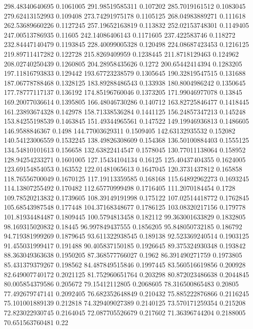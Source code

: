 298.48340640695 0.1061005
291.98519585311 0.107202
285.7019161512 0.1083045
279.62413152993 0.109408
273.74291975178 0.1105125
268.04983889271 0.111618
262.53689660226 0.1127245
257.19652163819 0.113832
252.02153748301 0.1149405
247.00513786935 0.11605
242.14086406143 0.1171605
237.422583746 0.118272
232.84447140479 0.1193845
228.40099005328 0.120498
224.08687423453 0.1216125
219.89711417282 0.122728
215.8269409959 0.1238445
211.8718129463 0.124962
208.02740250439 0.1260805
204.28958435626 0.1272
200.65442414394 0.1283205
197.11816793833 0.129442
193.67723238579 0.1305645
190.32819547515 0.131688
187.06778788468 0.1328125
183.89288486543 0.133938
180.8004986242 0.1350645
177.78777117137 0.136192
174.85196760046 0.1373205
171.99046977078 0.13845
169.20077036614 0.1395805
166.48046730286 0.140712
163.82725846477 0.1418445
161.23893674328 0.142978
158.71338536284 0.1441125
156.24857347213 0.145248
153.84255198539 0.1463845
151.49344965561 0.147522
149.19946936813 0.1486605
146.9588846367 0.1498
144.77003629311 0.1509405
142.63132935532 0.152082
140.54123006559 0.1532245
138.49826308609 0.154368
136.50100884403 0.1555125
134.54810101613 0.156658
132.63822414547 0.1578045
130.77011138064 0.158952
128.94254233271 0.1601005
127.15434104134 0.16125
125.40437404355 0.1624005
123.69154854053 0.163552
122.01481065613 0.1647045
120.3731437812 0.165858
118.76556700049 0.1670125
117.19113359585 0.168168
115.64892962273 0.1693245
114.13807255492 0.170482
112.65770999498 0.1716405
111.2070184454 0.1728
109.78520213832 0.1739605
108.39149191998 0.175122
107.02514418772 0.1762845
105.68543987548 0.177448
104.37168348677 0.1786125
103.08320217156 0.179778
101.81934484487 0.1809445
100.5794813458 0.182112
99.363001633829 0.1832805
98.169315020832 0.18445
96.997849437555 0.1856205
95.848050732185 0.186792
94.719381999269 0.1879645
93.611322938545 0.189138
92.523369240514 0.1903125
91.455031999417 0.191488
90.405837150185 0.1926645
89.375324930348 0.193842
88.363049363638 0.1950205
87.368577766027 0.1962
86.391490271759 0.1973805
85.431379379267 0.198562
84.487849515846 0.1997445
83.560516619856 0.200928
82.649007740172 0.2021125
81.752960651764 0.203298
80.872023486638 0.2044845
80.005854379586 0.205672
79.15412112805 0.2068605
78.316500865483 0.20805
77.492679747141 0.2092405
76.682352648849 0.210432
75.885222876866 0.2116245
75.101001889139 0.212818
74.329409027389 0.2140125
73.570171259354 0.215208
72.823022930745 0.2164045
72.087705526679 0.217602
71.36396744204 0.2188005
70.651563760481 0.22
